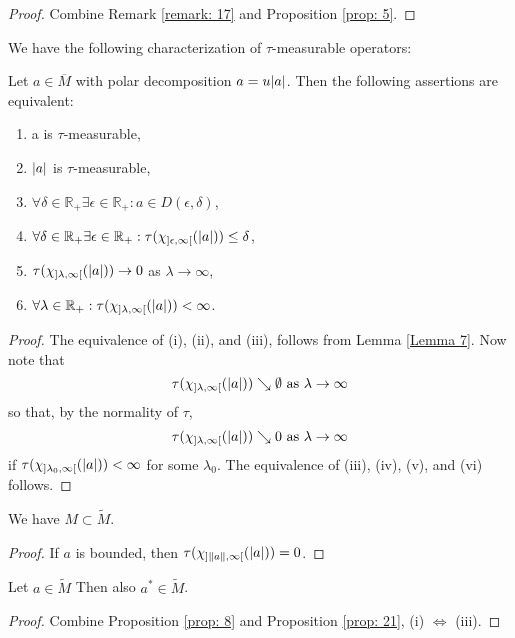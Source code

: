 \begin{proof}
    Combine Remark \ref{remark: 17} and Proposition \ref{prop: 5}.
\end{proof}
We have the following characterization of $\tau$-measurable operators:
\begin{proposition}\label{prop: 21}
    Let $a\in \overline{M}$ with polar decomposition $a=u\abs{a}$. Then the following assertions are equivalent:
    \begin{enumerate}
        \item a is $\tau$-measurable,
        \item $\abs{a}$ is $\tau$-measurable,
        \item $\forall \delta\in \mathbb{R}_+ \exists \epsilon\in \mathbb{R}_+: a\in D(\epsilon,\delta)$,
        \item $\forall \delta\in \mathbb{R}_+ \exists \epsilon\in \mathbb{R}_+: \tau(\chi_{]\epsilon,\infty[}(\abs{a}))\leq \delta$,
        \item $\tau(\chi_{]\lambda,\infty[}(\abs{a}))\to 0$ as $\lambda\to \infty$,
        \item $\forall \lambda\in \mathbb{R}_+:\tau(\chi_{]\lambda,\infty[}(\abs{a}))<\infty$.
    \end{enumerate}
\end{proposition}
\begin{proof}
    The equivalence of (i), (ii), and (iii), follows from Lemma \ref{Lemma 7}. Now note that
    \[
        \tau(\chi_{]\lambda,\infty[}(\abs{a}))\searrow \emptyset \text{ as }\lambda\to \infty
    \]
    so that, by the normality of $\tau$,
    \[
        \tau(\chi_{]\lambda,\infty[}(\abs{a}))\searrow 0 \text{ as }\lambda\to \infty
    \]
    if $ \tau(\chi_{]\lambda_0,\infty[}(\abs{a}))<\infty$ for some $\lambda_0$. The equivalence of (iii), (iv), (v), and (vi) follows.
\end{proof}
\begin{corollary}
    We have $M\subset \widetilde{M}$.
\end{corollary}
\begin{proof}
    If $a$ is bounded, then $\tau(\chi_{]\norm{a},\infty[}(\abs{a}))=0$.
\end{proof}
\begin{proposition}
    Let $a\in \widetilde{M}$ Then also $a^*\in \widetilde{M}$.
\end{proposition}
\begin{proof}
    Combine Proposition \ref{prop: 8} and Proposition \ref{prop: 21}, (i) $\Leftrightarrow$ (iii).
\end{proof}
